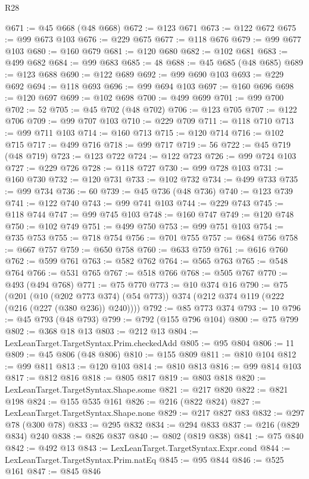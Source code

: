 \begin{lexlean}{R28}
\begin{coremodule}
@671 := @45 @668 (@48 @668)
@672 := @123 @671
@673 := @122 @672
@675 := @99 @673 @103
@676 := @229 @675
@677 := @118 @676
@679 := @99 @677 @103
@680 := @160 @679
@681 := @120 @680
@682 := @102 @681
@683 := @499 @682
@684 := @99 @683
@685 := 48
@688 := @45 @685 (@48 @685)
@689 := @123 @688
@690 := @122 @689
@692 := @99 @690 @103
@693 := @229 @692
@694 := @118 @693
@696 := @99 @694 @103
@697 := @160 @696
@698 := @120 @697
@699 := @102 @698
@700 := @499 @699
@701 := @99 @700
@702 := 52
@705 := @45 @702 (@48 @702)
@706 := @123 @705
@707 := @122 @706
@709 := @99 @707 @103
@710 := @229 @709
@711 := @118 @710
@713 := @99 @711 @103
@714 := @160 @713
@715 := @120 @714
@716 := @102 @715
@717 := @499 @716
@718 := @99 @717
@719 := 56
@722 := @45 @719 (@48 @719)
@723 := @123 @722
@724 := @122 @723
@726 := @99 @724 @103
@727 := @229 @726
@728 := @118 @727
@730 := @99 @728 @103
@731 := @160 @730
@732 := @120 @731
@733 := @102 @732
@734 := @499 @733
@735 := @99 @734
@736 := 60
@739 := @45 @736 (@48 @736)
@740 := @123 @739
@741 := @122 @740
@743 := @99 @741 @103
@744 := @229 @743
@745 := @118 @744
@747 := @99 @745 @103
@748 := @160 @747
@749 := @120 @748
@750 := @102 @749
@751 := @499 @750
@753 := @99 @751 @103
@754 := @735 @753
@755 := @718 @754
@756 := @701 @755
@757 := @684 @756
@758 := @667 @757
@759 := @650 @758
@760 := @633 @759
@761 := @616 @760
@762 := @599 @761
@763 := @582 @762
@764 := @565 @763
@765 := @548 @764
@766 := @531 @765
@767 := @518 @766
@768 := @505 @767
@770 := @493 (@494 @768)
@771 := @75 @770
@773 := @10 @374 @16
@790 := @75
    (@201
      (@10 (@202 @773 @374) (@54 @773))
      @374
      (@212 @374 @119 (@222 (@216 (@227 (@380 @236)) @240))))
@792 := @85 @773 @374
@793 := 10
@796 := @45 @793 (@48 @793)
@799 := @792 (@155 @796 @104)
@800 := @75 @799
@802 := @368 @18 @13
@803 := @212 @13
@804 := LexLeanTarget.TargetSyntax.Prim.checkedAdd
@805 := @95 @804
@806 := 11
@809 := @45 @806 (@48 @806)
@810 := @155 @809
@811 := @810 @104
@812 := @99 @811
@813 := @120 @103
@814 := @810 @813
@816 := @99 @814 @103
@817 := @812 @816
@818 := @805 @817
@819 := @803 @818
@820 := LexLeanTarget.TargetSyntax.Shape.some
@821 := @217 @820
@822 := @821 @198
@824 := @155 @535 @161
@826 := @216 (@822 @824)
@827 := LexLeanTarget.TargetSyntax.Shape.none
@829 := @217 @827 @83
@832 := @297 @78 (@300 @78)
@833 := @295 @832
@834 := @294 @833
@837 := @216 (@829 @834) @240
@838 := @826 @837
@840 := @802 (@819 @838)
@841 := @75 @840
@842 := @492 @13
@843 := LexLeanTarget.TargetSyntax.Expr.cond
@844 := LexLeanTarget.TargetSyntax.Prim.natEq
@845 := @95 @844
@846 := @525 @161
@847 := @845 @846

\end{coremodule}
\end{lexlean}
